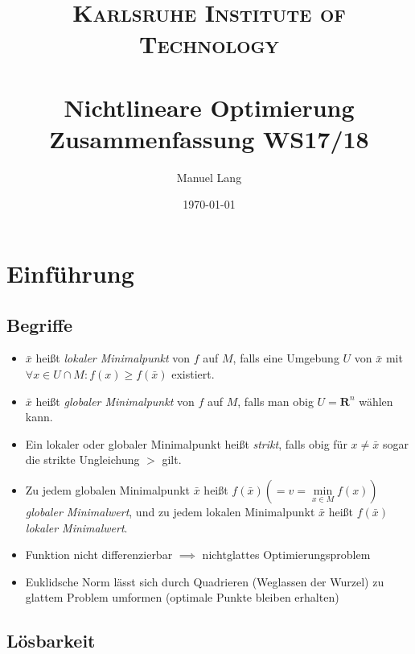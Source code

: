 \documentclass[paper=a4, fontsize=11pt]{scrartcl} %
\title{
\normalfont \normalsize
\textsc{Karlsruhe Institute of Technology} \\ [25pt] %
\horrule{0.5pt} \\[0.4cm] %
\huge Nichtlineare Optimierung\\ Zusammenfassung WS17/18 %
\horrule{2pt} \\[0.5cm] %
}
\author{Manuel Lang} %
\date{\normalsize\today} %
\numberwithin{equation}{section} %
\numberwithin{figure}{section} %
\numberwithin{table}{section} %
\begin{document}
\maketitle %

\section{Einführung}

\subsection{Begriffe}

\begin{itemize}
\item $\bar{x}$ heißt \textit{lokaler Minimalpunkt} von $f$ auf $M$, falls eine Umgebung $U$ von $\bar{x}$ mit $\forall x \in U \cap M: f(x) \ge f(\bar{x})$ existiert.
\item $\bar{x}$ heißt \textit{globaler Minimalpunkt} von $f$ auf $M$, falls man obig $U = \mathbf{R}^n$ wählen kann.
\item Ein lokaler oder globaler Minimalpunkt heißt \textit{strikt}, falls obig für $x \neq \bar{x}$ sogar die strikte Ungleichung $>$ gilt.
\item Zu jedem globalen Minimalpunkt $\bar{x}$ heißt $f(\bar{x}) (=v= \min\limits_{x \in M} f(x))$ \textit{globaler Minimalwert}, und zu jedem lokalen Minimalpunkt $\bar{x}$ heißt $f(\bar{x})$ \textit{lokaler Minimalwert}.
\item Funktion nicht differenzierbar $\implies$ nichtglattes Optimierungsproblem
\item Euklidsche Norm lässt sich durch Quadrieren (Weglassen der Wurzel) zu glattem Problem umformen (optimale Punkte bleiben erhalten)
\end{itemize}

\subsection{Lösbarkeit}
\end{document}
